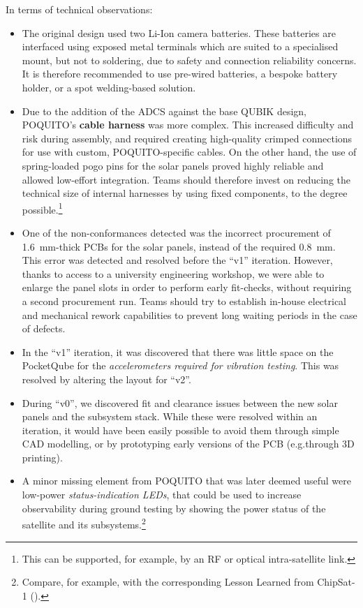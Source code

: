 \documentclass[a4paper,nobib,justified,final]{tufte-book}
\begin{document}
In terms of technical observations:
\begin{itemize}[itemsep=-1ex]
	\item The original design used two Li-Ion camera batteries. These batteries are interfaced using exposed metal terminals which are suited to a specialised mount, but not to soldering, due to safety and connection reliability concerns. It is therefore recommended to use pre-wired batteries, a bespoke battery holder, or a spot welding-based solution.
	\item Due to the addition of the \acs{ADCS} against the base QUBIK design, POQUITO's \textbf{cable harness} was more complex. This increased difficulty and risk during assembly, and required creating high-quality crimped connections for use with custom, POQUITO-specific cables. On the other hand, the use of spring-loaded pogo pins for the solar panels proved highly reliable and allowed low-effort integration. Teams should therefore invest on reducing the technical size of internal harnesses by using fixed components, to the degree possible.\footnote{This can be supported, for example, by an \acs{RF} or optical intra-satellite link.}
	\item One of the non-conformances detected was the incorrect procurement of \qty{1.6}{\milli\meter}-thick \acsp{PCB} for the solar panels, instead of the required \qty{0.8}{\milli\meter}. This error was detected and resolved before the ``v1'' iteration. However, thanks to access to a university engineering workshop, we were able to enlarge the panel slots in order to perform early fit-checks, without requiring a second procurement run. Teams should try to establish in-house electrical and mechanical rework capabilities to prevent long waiting periods in the case of defects.
	\item In the ``v1'' iteration, it was discovered that there was little space on the PocketQube for the \emph{accelerometers required for vibration testing}. This was resolved by altering the layout for ``v2''.
	\item During ``v0'', we discovered fit and clearance issues between the new solar panels and the subsystem stack. While these were resolved within an iteration, it would have been easily possible to avoid them through simple \acs{CAD} modelling, or by prototyping early versions of the \acs{PCB} (e.g.\@ through 3D printing).
	\item A minor missing element from POQUITO that was later deemed useful were low-power \emph{status-indication \acsp{LED}}, that could be used to increase observability during ground testing by showing the power status of the satellite and its subsystems.\footnote{Compare, for example, with the corresponding Lesson Learned from ChipSat-1 ().}

\end{itemize}
\end{document}
